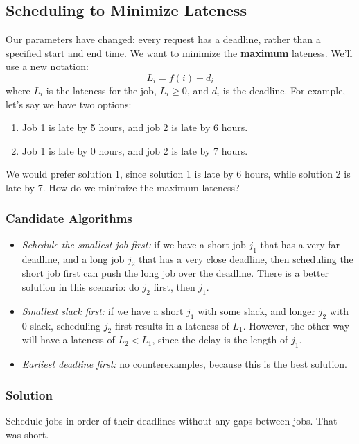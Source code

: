 \documentclass[11pt]{article}
\begin{document}
\subsection{Scheduling to Minimize Lateness}
Our parameters have changed: every request has a deadline, rather than a specified start and end time. We want to minimize the \textbf{maximum} lateness. We'll use a new notation: $$L_i = f(i) - d_i$$
where $L_i$ is the lateness for the job, $L_i \geq 0$, and $d_i$ is the deadline. For example, let's say we have two options:
\begin{enumerate}
    \item Job 1 is late by 5 hours, and job 2 is late by 6 hours.
    \item Job 1 is late by 0 hours, and job 2 is late by 7 hours.
\end{enumerate}
We would prefer solution 1, since solution 1 is late by 6 hours, while solution 2 is late by 7. How do we minimize the maximum lateness?
\subsubsection{Candidate Algorithms}
\begin{itemize}
    \item \textit{Schedule the smallest job first:} if we have a short job $j_1$ that has a very far deadline, and a long job $j_2$ that has a very close deadline, then scheduling the short job first can push the long job over the deadline. There is a better solution in this scenario: do $j_2$ first, then $j_1$.
    \item \textit{Smallest slack first:} if we have a short $j_1$ with some slack, and longer $j_2$ with 0 slack, scheduling $j_2$ first results in a lateness of $L_1$. However, the other way will have a lateness of $L_2 < L_1$, since the delay is the length of $j_1$.
    \item \textit{Earliest deadline first:} no counterexamples, because this is the best solution.
\end{itemize}
\subsubsection{Solution}
Schedule jobs in order of their deadlines without any gaps between jobs. That was short.
\end{document}
